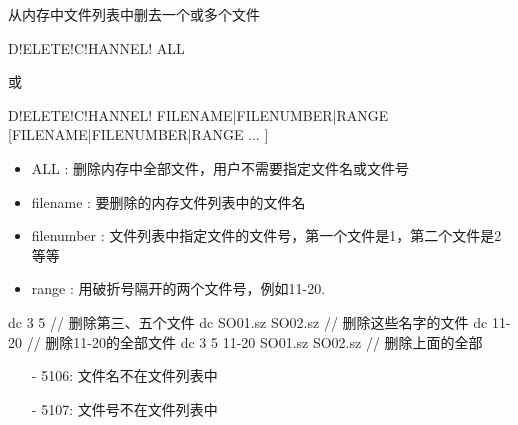 \label{cmd:deletechannel}

从内存中文件列表中删去一个或多个文件

\begin{SACSTX}
D!ELETE!C!HANNEL! ALL
\end{SACSTX}
或
\begin{SACSTX}
D!ELETE!C!HANNEL! FILENAME|FILENUMBER|RANGE [FILENAME|FILENUMBER|RANGE ... ]
\end{SACSTX}

\begin{itemize}
\item ALL : 删除内存中全部文件，用户不需要指定文件名或文件号
\item filename : 要删除的内存文件列表中的文件名
\item filenumber : 文件列表中指定文件的文件号，第一个文件是1，第二个文件是2等等
\item range : 用破折号隔开的两个文件号，例如11-20.
\end{itemize}

\begin{SACCode}
  dc 3 5                         // 删除第三、五个文件
  dc SO01.sz SO02.sz             // 删除这些名字的文件
  dc 11-20                       // 删除11-20的全部文件
  dc 3 5 11-20 SO01.sz SO02.sz   // 删除上面的全部
\end{SACCode}

\begin{itemize}
\item[-]5106: 文件名不在文件列表中
\item[-]5107: 文件号不在文件列表中
\end{itemize}

